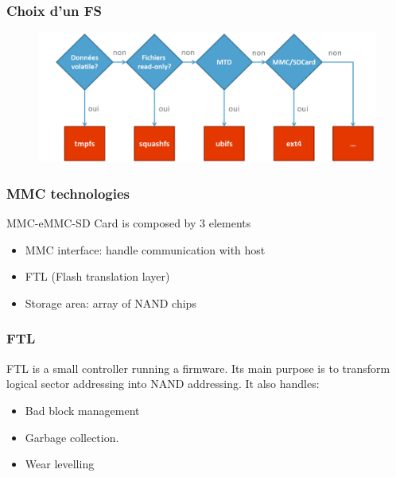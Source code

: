 \documentclass[resume]{subfiles}
\begin{document}
\subsubsection{Choix d'un FS}
\begin{figure}[H]
    \centering
    \includegraphics[width=1\columnwidth]{Figures/fileSystem/fileSystemChoice.PNG}
    \label{fig:fileSystemChoice}
\end{figure}

\subsubsection{MMC technologies}
MMC-eMMC-SD Card is composed by 3 elements
\begin{itemize}
    \item MMC interface: handle communication with host
    \item FTL (Flash translation layer)
    \item Storage area: array of NAND chips
\end{itemize}

\subsubsection{FTL}
FTL is a small controller running a firmware. Its main purpose is to transform logical sector addressing into NAND addressing. It also handles:
\begin{itemize}
    \item Bad block management
    \item Garbage collection.
    \item Wear levelling
\end{itemize}
\end{document}
